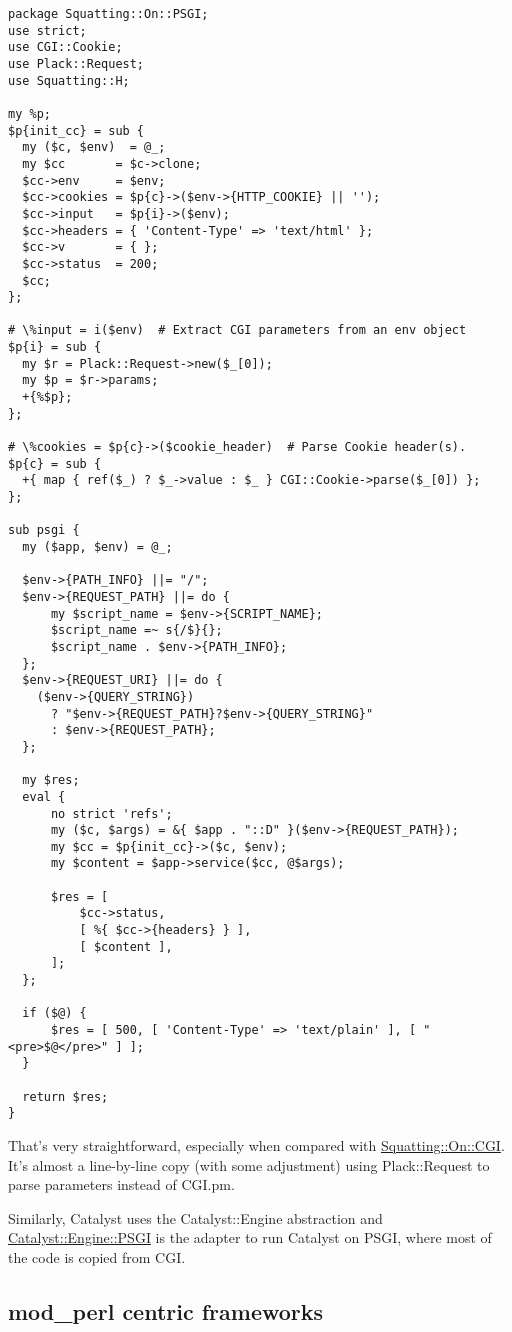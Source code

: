 \begin{lstlisting}
package Squatting::On::PSGI;
use strict;
use CGI::Cookie;
use Plack::Request;
use Squatting::H;

my %p;
$p{init_cc} = sub {
  my ($c, $env)  = @_;
  my $cc       = $c->clone;
  $cc->env     = $env;
  $cc->cookies = $p{c}->($env->{HTTP_COOKIE} || '');
  $cc->input   = $p{i}->($env);
  $cc->headers = { 'Content-Type' => 'text/html' };
  $cc->v       = { };
  $cc->status  = 200;
  $cc;
};

# \%input = i($env)  # Extract CGI parameters from an env object
$p{i} = sub {
  my $r = Plack::Request->new($_[0]);
  my $p = $r->params;
  +{%$p};
};

# \%cookies = $p{c}->($cookie_header)  # Parse Cookie header(s).
$p{c} = sub {
  +{ map { ref($_) ? $_->value : $_ } CGI::Cookie->parse($_[0]) };
};

sub psgi {
  my ($app, $env) = @_;

  $env->{PATH_INFO} ||= "/";
  $env->{REQUEST_PATH} ||= do {
      my $script_name = $env->{SCRIPT_NAME};
      $script_name =~ s{/$}{};
      $script_name . $env->{PATH_INFO};
  };
  $env->{REQUEST_URI} ||= do {
    ($env->{QUERY_STRING})
      ? "$env->{REQUEST_PATH}?$env->{QUERY_STRING}"
      : $env->{REQUEST_PATH};
  };

  my $res;
  eval {
      no strict 'refs';
      my ($c, $args) = &{ $app . "::D" }($env->{REQUEST_PATH});
      my $cc = $p{init_cc}->($c, $env);
      my $content = $app->service($cc, @$args);

      $res = [
          $cc->status,
          [ %{ $cc->{headers} } ],
          [ $content ],
      ];
  };

  if ($@) {
      $res = [ 500, [ 'Content-Type' => 'text/plain' ], [ "<pre>$@</pre>" ] ];
  }

  return $res;
}
\end{lstlisting}

That's very straightforward, especially when compared with
\href{http://cpansearch.perl.org/src/BEPPU/Squatting-0.70/lib/Squatting/On/CGI.pm}{Squatting::On::CGI}.
It's almost a line-by-line copy (with some adjustment) using
Plack::Request to parse parameters instead of CGI.pm.

Similarly, Catalyst uses the Catalyst::Engine abstraction and
\href{http://search.cpan.org/perldoc?Catalyst::Engine::PSGI}{Catalyst::Engine::PSGI}
is the adapter to run Catalyst on PSGI, where most of the code is copied
from CGI.

\subsection{mod\_perl centric
frameworks}\label{modux5fperl-centric-frameworks}

